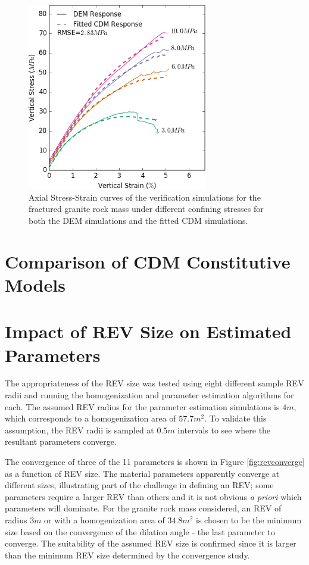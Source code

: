 \begin{figure}[!htb]
\begin{center}
\includegraphics[width=0.7\textwidth]{figures/fittedCurves/voronoiGraniteVerify_druckerDamage_lastFrame_dir-2}
\caption{{\label{fig:fitted2} Axial Stress-Strain curves of the verification simulations for the fractured granite rock mass under different confining stresses for both the DEM simulations and the fitted CDM simulations.%
}}
\end{center}
\end{figure}

\section{Comparison of CDM Constitutive Models}

\section{Impact of REV Size on Estimated Parameters}

The appropriateness of the REV size was tested using eight different sample REV radii and running the homogenization and parameter estimation algorithms for each. The assumed REV radius for the parameter estimation simulations is $4m$, which corresponds to a homogenization area of $57.7 m^2$. To validate this assumption, the REV radii is sampled at $0.5m$ intervals to see where the resultant parameters converge.

The convergence of three of the 11 parameters is shown in Figure \ref{fig:revconverge} as a function of REV size. The material parameters apparently converge at different sizes, illustrating part of the challenge in defining an REV; some parameters require a larger REV than others and it is not obvious \textit{a priori} which parameters will dominate. For the granite rock mass considered, an REV of radius $3m$ or with a homogenization area of $34.8 m^2$ is chosen to be the minimum size based on the convergence of the dilation angle - the last parameter to converge. The suitability of the assumed REV size is confirmed since it is larger than the minimum REV size determined by the convergence study.

